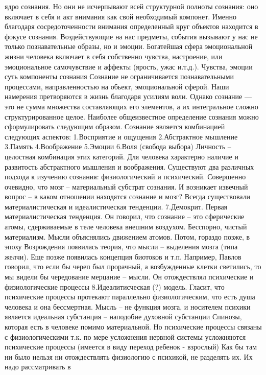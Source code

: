 \documentclass[12pt]{article}
\begin{document}
ядро сознания. Но они не исчерпывают всей структурной полноты сознания: оно включает в себя и акт
внимания как свой необходимый компонет. Именно благодаря сосредоточенности внимания определенный круг
объектов находится в фокусе сознания. Воздействующие на нас предметы, события вызывают у нас не только
познавательные образы, но и эмоции. Богатейшая сфера эмоциональной жизни человека включает в себя
собственно чувства, настроение, или эмоциональное самочувствие и аффекты (ярость, ужас и.т.д.). Чувства,
эмоции суть компоненты сознания Сознание не ограничивается познавательными процессами,
направленностью на обьект, эмоциональной сферой. Наши намерения претворяются в жизнь благодаря усилиям
воли. Однако сознание — это не сумма множества составляющих его элементов, а их интегральное сложно
структурированное целое.
Наиболее общеизвестное определение сознания можно сформулировать следующим образом. Сознание
является комбинацией следующих аспектов:
1.Восприятие и ощущения 
2.Абстрактное мышление
3.Память
4.Воображение
5.Эмоции 
6.Воля (свобода выбора)
Личность – целостная комбинация этих категорий. Для человека характерно наличие и развитость абстрактного
мышления и воображения. Существуют два различных подхода к изучению сознания: физиологический и
психический. 
Совершенно очевидно, что мозг – материальный субстрат сознания. И возникает извечный вопрос – в каком
отношении находятся сознание и мозг? Всегда существовали материалистическая и идеалистическая
тенденции. 
7.Демокрит. Первая материалистическая тенденция. Он говорил, что сознание – это сферические атомы, 
сдерживаемые в теле человека внешним воздухом. Бесспорно, чистый материализм. Мысли объяснялись
движением атомов. Потом, гораздо позже, в эпоху Возрождения появилась теория, что мысли – выделения мозга
(типа желчи). Еще позже появилась концепция биотоков и т.п. Например, Павлов говорил, что если бы череп
был прорачный, а возбужденные клетки светились, то мы видели бы чередование мерцание – мысли. Он
отождествлял психические и физиологические процессы 
8.Идеалитисческая (?) модель. Гласит, что психические процессы протекают параллельно физиологическим, что
есть душа человека и она бессмертная. Мысль – не функция мозга, и носителем психики является идеальная
субстанция – наподобие духовной субстанции Спинозы, которая есть в человеке помимо материальной. Но
психические процессы связаны с физиологическими т.к. по мере усложнения нервной системы усложняются
психические процессы (имеется в виду переход ребенок - взрослый)
Как бы там ни было нельзя ни отождествлять физиологию с психикой, не разделять их. Их надо рассматривать в
\end{document}
